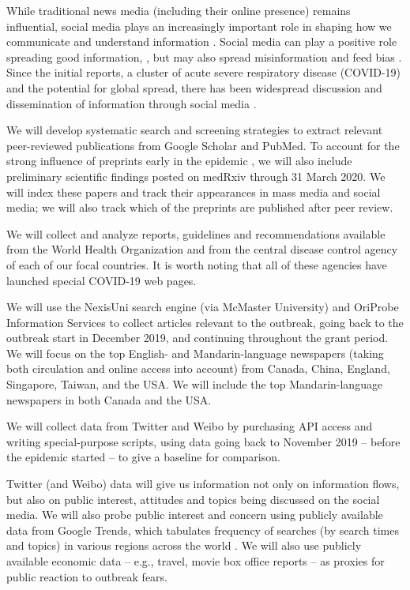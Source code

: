 While traditional news media (including their online presence) remains influential,  social media plays an increasingly important role in shaping how we communicate and understand information \citep{LiuSieg19}. Social media can play a positive role spreading good information, \cite{BascHill20, SunYang20,AhmeQuin18}, but may also spread misinformation and feed bias \citep{ChouOhA18, McKevan19}.
Since the initial reports, a cluster of acute severe respiratory disease (COVID-19) and the potential for global spread, there has been widespread discussion and dissemination of information through social media \citep{AhmeBath19, ChewEyse10, TangBie18}.



 We will develop systematic search and screening strategies to extract relevant peer-reviewed publications from Google Scholar and PubMed. To account for the strong influence of preprints early in the epidemic \cite{MajuMandPRE}, we will also include preliminary scientific findings posted on medRxiv through 31 March 2020. We will index these papers and track their appearances in mass media and social media; we will also track which of the preprints are published after peer review.

 We will collect and analyze reports, guidelines and recommendations available from the World Health Organization and from the central disease control agency of each of our focal countries. It is worth noting that all of these agencies have launched special COVID-19 web pages.

 We will use the NexisUni search engine (via McMaster University) and OriProbe Information Services to collect articles relevant to the outbreak, going back to the outbreak start in December 2019, and continuing throughout the grant period. 
We will focus on the top English- and Mandarin-language newspapers (taking both circulation and online access into account) from 
Canada, China, England, Singapore, Taiwan, and the USA.
We will include the top Mandarin-language newspapers in both Canada and the USA.

We will collect data from Twitter and Weibo by purchasing API access and writing special-purpose scripts, using data going back to November 2019 -- before the epidemic started -- to give a baseline for comparison. 

Twitter (and Weibo) data will give us information not only on information flows, but also on public interest, attitudes and topics being discussed on the social media. We will also probe public interest and concern using publicly available data from Google Trends, which tabulates frequency of searches (by search times and topics) in various regions across the world \cite{BousAgac17, MahrBrag19}.
We will also use publicly available economic data -- e.g., travel, movie box office reports -- as proxies for public reaction to outbreak fears. 

